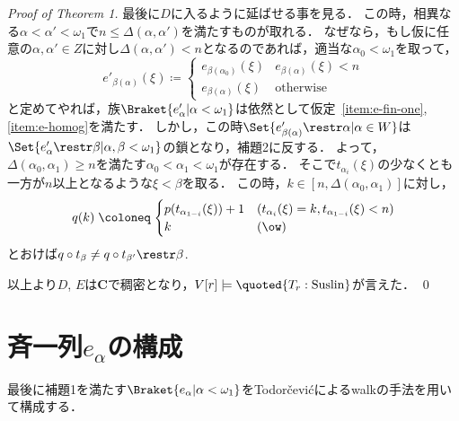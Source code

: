 \documentclass[a4j]{ltjsarticle}
\renewcommand{\defeq}{\mathrel{\coloneq}}
\begin{document}
\begin{proof}[Proof of Theorem 1]
 最後に$D$に入るように延ばせる事を見る．
 この時，相異なる$\alpha < \alpha' < \omega_1$で$n \leq \Delta(\alpha, \alpha')$を満たすものが取れる．
 なぜなら，もし仮に任意の$\alpha, \alpha' \in Z$に対し$\Delta(\alpha, \alpha') < n$となるのであれば，適当な$\alpha_0 < \omega_1$を取って，
 \[
  e'_{\beta(\alpha)}(\xi) \defeq \begin{cases}
                                  e_{\beta(\alpha_0)}(\xi) & e_{\beta(\alpha)}(\xi) < n\\
                                  e_{\beta(\alpha)}(\xi)   & \text{otherwise}
                                 \end{cases}
 \]
 と定めてやれば，族$\Braket{e'_\alpha | \alpha < \omega_1}$は依然として仮定~\ref{item:e-fin-one}, \ref{item:e-homog}を満たす．
 しかし，この時$\Set{e'_{\beta(\alpha)} \restr \alpha | \alpha \in W}$は$\Set{e'_\alpha \restr \beta | \alpha, \beta < \omega_1}$の鎖となり，補題2に反する．
 よって，$\Delta(\alpha_0, \alpha_1) \geq n$を満たす$\alpha_0 < \alpha_1 < \omega_1$が存在する．
 そこで$t_{\alpha_i}(\xi)$の少なくとも一方が$n$以上となるような$\xi < \beta$を取る．
 この時，$k \in [n, \Delta(\alpha_0, \alpha_1)]$に対し，
 \[
  q(k) \defeq
  \begin{cases}
   p(t_{\alpha_{1-i}}(\xi)) + 1 & (t_{\alpha_i}(\xi) = k, t_{\alpha_{1-i}}(\xi) < n)\\
   k & (\ow)
 \end{cases}
 \]
 とおけば$q \circ t_\beta \neq q \circ t_{\beta'} \restr \beta$.

 以上より$D$, $E$は$\mathbf{C}$で稠密となり，$V[r] \models \quoted{T_r: \text{Suslin}}$が言えた． \qed
\end{proof}

\section{斉一列$e_\alpha$の構成}
最後に補題1を満たす$\Braket{e_\alpha | \alpha < \omega_1}$をTodor\v{c}evi\'{c}によるwalkの手法を用いて構成する．
\end{document}
